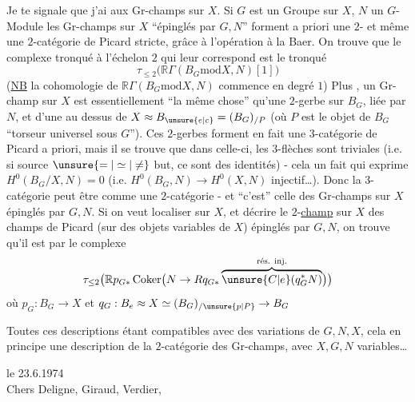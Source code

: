 Je te signale que j'ai  aux Gr-champs sur $X$. Si $G$ est un Groupe sur $X$, $N$ un $G$-Module les Gr-champs sur $X$ ``épinglés par $G,N$'' forment a priori une $2$- et même une $2$-catégorie de Picard stricte, grâce à l'opération  à la Baer. On trouve que le complexe  tronqué à l'échelon $2$ qui leur correspond est le tronqué
\[
\tau_{\leq 2}\bigl(\mathbb R\Gamma(B_{G}\mathbin{\mathrm{mod}}X,N)[1]\bigr)
\]
(\uline{NB} la cohomologie de $\mathbb R\Gamma(B_{G}\mathbin{\mathrm{mod}}X,N)$ commence en degré $1$) Plus , un Gr-champ sur $X$   est essentiellement ``la même chose'' qu'une $2$-gerbe sur $B_{G}$, liée par $N$, et  d'une  au dessus de $X\approx B_{\unsure{e|c}}=(B_{G})_{/P}$ (où $P$ est le objet de $B_{G}$ ``torseur universel sous $G$''). Ces $2$-gerbes forment en fait une $3$-catégorie de Picard a priori, mais il se
trouve que dans celle-ci, les $3$-flèches sont triviales (i.e. si source $\unsure{=|\simeq|\ne}$ but, ce sont des identités) - cela un fait qui exprime $H^{0}(B_{G}/X,N)=0$ (i.e. $H^{0}(B_{G},N)\to H^{0}(X,N)$ injectif\ldots). Donc la $3$-catégorie peut être  comme une $2$-catégorie - et ``c'est'' celle des Gr-champs sur $X$ épinglés par $G,N$. Si on veut localiser sur $X$, et décrire le $2$-\uline{champ}  sur $X$ des champs de Picard (sur des objets variables de $X$) épinglés par $G,N$, on trouve qu'il est  par le complexe
\[
\tau_{\leq 2}\bigl(\mathbb R p_{G*}\operatorname{Coker}\bigl(N\to Rq_{G*}\overbrace{\unsure{C|e}(q_{G}^{*}N)}^{\text{rés. inj.}}\bigr)\bigr)
\]
où $p_{G}:B_{G}\to X$ et $q_{G}:B_{e}\approx X\simeq(B_{G})_{/\unsure{p|P}}\to B_{G}$

Toutes ces descriptions étant compatibles avec des variations de $G,N,X$, cela  en principe une description de la $2$-catégorie des Gr-champs, avec $X,G,N$ variables\ldots

\noindent\hfill{} le 23.6.1974\\

Chers Deligne, Giraud, Verdier,\\

